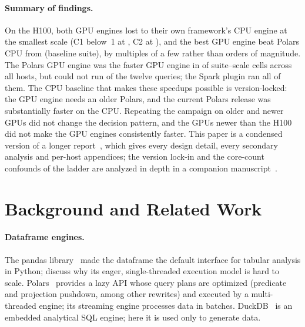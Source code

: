 \documentclass[sigconf, nonacm]{acmart}
\begin{document}
\paragraph{Summary of findings.} On the H100, both GPU engines lost to their
own framework's CPU engine at the smallest scale (C1 below~1 at
, C2 at ), and
the best GPU engine beat Polars CPU from 
(baseline suite), by multiples of a few rather than orders of magnitude. The
Polars GPU engine was the faster GPU engine in  of
 suite--scale cells across all hosts, but could not run
 of the twelve queries; the
Spark plugin ran all of them. The CPU baseline that
makes these speedups possible is version-locked: the GPU engine needs an older
Polars, and the current Polars release was substantially faster on the CPU.
\ifladderran
Repeating the campaign on older and newer GPUs did not change the decision
pattern, and the GPUs newer than the H100 did not make the GPU engines
consistently faster.
\fi
This paper is a condensed version of a longer report~\citep{ejiofor2026extended},
which gives every design detail, every secondary analysis and per-host
appendices; the version lock-in and the core-count confounds of the ladder are
analyzed in depth in a companion manuscript~\citep{ejiofor2026lockin}.

\section{Background and Related Work}
\label{sec:background}

\paragraph{Dataframe engines.} The pandas library~\citep{mckinney2010pandas}
made the dataframe the default interface for tabular analysis in Python;
\citet{petersohn2020dataframes} discuss why its eager, single-threaded execution
model is hard to scale. Polars~\citep{polars1442,polars200} provides a lazy API
whose query plans are optimized (predicate and projection pushdown, among other
rewrites) and executed by a multi-threaded engine; its streaming engine
processes data in batches. DuckDB~\citep{raasveldt2019duckdb} is an embedded
analytical SQL engine; here it is used only to generate data.
\end{document}
